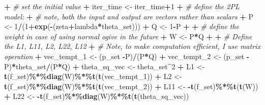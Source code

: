 \documentclass[
]{article}
\newenvironment{Shaded}{\begin{snugshade}}{\end{snugshade}}
\newcommand{\CommentTok}[1]{\textcolor[rgb]{0.56,0.35,0.01}{\textit{#1}}}
\newcommand{\DecValTok}[1]{\textcolor[rgb]{0.00,0.00,0.81}{#1}}
\newcommand{\FunctionTok}[1]{\textcolor[rgb]{0.13,0.29,0.53}{\textbf{#1}}}
\newcommand{\NormalTok}[1]{#1}
\newcommand{\OtherTok}[1]{\textcolor[rgb]{0.56,0.35,0.01}{#1}}
\newcommand{\SpecialCharTok}[1]{\textcolor[rgb]{0.81,0.36,0.00}{\textbf{#1}}}
\begin{document}
\begin{Shaded}
\begin{Highlighting}[]
\SpecialCharTok{+}   \CommentTok{\# set the initial value}
\SpecialCharTok{+}\NormalTok{   iter\_time }\OtherTok{\textless{}{-}}\NormalTok{ iter\_time}\SpecialCharTok{+}\DecValTok{1}
\SpecialCharTok{+}   \CommentTok{\# define the 2PL model:}
\SpecialCharTok{+}   \CommentTok{\# note, both the input and output are vectors rather than scalars}
\SpecialCharTok{+}\NormalTok{   P }\OtherTok{\textless{}{-}} \DecValTok{1}\SpecialCharTok{/}\NormalTok{(}\DecValTok{1}\SpecialCharTok{+}\FunctionTok{exp}\NormalTok{(}\SpecialCharTok{{-}}\NormalTok{(zeta}\SpecialCharTok{+}\NormalTok{lambda}\SpecialCharTok{*}\NormalTok{theta\_set)))}
\SpecialCharTok{+}\NormalTok{   Q }\OtherTok{\textless{}{-}} \DecValTok{1}\SpecialCharTok{{-}}\NormalTok{P}
\SpecialCharTok{+}   
\SpecialCharTok{+}   \CommentTok{\# define the weight in case of using normal ogive in the future}
\SpecialCharTok{+}\NormalTok{   W }\OtherTok{\textless{}{-}}\NormalTok{ P}\SpecialCharTok{*}\NormalTok{Q}
\SpecialCharTok{+}   
\SpecialCharTok{+}   \CommentTok{\# Define the L1, L11, L2, L22, L12}
\SpecialCharTok{+}   \CommentTok{\# Note, to make computation efficient, I use matrix operation}
\SpecialCharTok{+}\NormalTok{   vec\_tempt\_1 }\OtherTok{\textless{}{-}}\NormalTok{ (p\_set }\SpecialCharTok{{-}}\NormalTok{P)}\SpecialCharTok{/}\NormalTok{(P}\SpecialCharTok{*}\NormalTok{Q)}
\SpecialCharTok{+}\NormalTok{   vec\_tempt\_2 }\OtherTok{\textless{}{-}}\NormalTok{ (p\_set }\SpecialCharTok{{-}}\NormalTok{P)}\SpecialCharTok{*}\NormalTok{theta\_set}\SpecialCharTok{/}\NormalTok{(P}\SpecialCharTok{*}\NormalTok{Q)}
\SpecialCharTok{+}\NormalTok{   theta\_sq\_vec }\OtherTok{\textless{}{-}}\NormalTok{ theta\_set}\SpecialCharTok{\^{}}\DecValTok{2}
\SpecialCharTok{+}\NormalTok{   L1 }\OtherTok{\textless{}{-}} \FunctionTok{t}\NormalTok{(f\_set)}\SpecialCharTok{\%*\%}\FunctionTok{diag}\NormalTok{(W)}\SpecialCharTok{\%*\%}\FunctionTok{t}\NormalTok{(}\FunctionTok{t}\NormalTok{(vec\_tempt\_1))}
\SpecialCharTok{+}\NormalTok{   L2 }\OtherTok{\textless{}{-}} \FunctionTok{t}\NormalTok{(f\_set)}\SpecialCharTok{\%*\%}\FunctionTok{diag}\NormalTok{(W)}\SpecialCharTok{\%*\%}\FunctionTok{t}\NormalTok{(}\FunctionTok{t}\NormalTok{(vec\_tempt\_2))}
\SpecialCharTok{+}\NormalTok{   L11 }\OtherTok{\textless{}{-}} \SpecialCharTok{{-}}\FunctionTok{t}\NormalTok{(f\_set)}\SpecialCharTok{\%*\%}\FunctionTok{t}\NormalTok{(}\FunctionTok{t}\NormalTok{(W))}
\SpecialCharTok{+}\NormalTok{   L22 }\OtherTok{\textless{}{-}} \SpecialCharTok{{-}}\FunctionTok{t}\NormalTok{(f\_set)}\SpecialCharTok{\%*\%}\FunctionTok{diag}\NormalTok{(W)}\SpecialCharTok{\%*\%}\FunctionTok{t}\NormalTok{(}\FunctionTok{t}\NormalTok{(theta\_sq\_vec))}

\end{Highlighting}
\end{Shaded}
\end{document}
